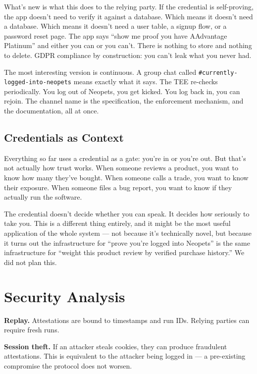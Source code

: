 \documentclass[twocolumn,10pt]{article}
\begin{document}
What's new is what this does to the relying party.
If the credential is self-proving, the app doesn't need to verify it against a database.
Which means it doesn't need a database.
Which means it doesn't need a user table, a signup flow, or a password reset page.
The app says ``show me proof you have AAdvantage Platinum'' and either you can or you can't.
There is nothing to store and nothing to delete.
GDPR compliance by construction: you can't leak what you never had.

The most interesting version is continuous.
A group chat called \texttt{\#currently-logged-into-neopets} means exactly what it says.
The TEE re-checks periodically.
You log out of Neopets, you get kicked.
You log back in, you can rejoin.
The channel name is the specification, the enforcement mechanism, and the documentation, all at once.

\subsection{Credentials as Context}

Everything so far uses a credential as a gate: you're in or you're out.
But that's not actually how trust works.
When someone reviews a product, you want to know how many they've bought.
When someone calls a trade, you want to know their exposure.
When someone files a bug report, you want to know if they actually run the software.

The credential doesn't decide whether you can speak.
It decides how seriously to take you.
This is a different thing entirely, and it might be the most useful application of the whole system --- not because it's technically novel, but because it turns out the infrastructure for ``prove you're logged into Neopets'' is the same infrastructure for ``weight this product review by verified purchase history.''
We did not plan this.

\section{Security Analysis}
\label{sec:security}

\textbf{Replay.} Attestations are bound to timestamps and run IDs. Relying parties can require fresh runs.

\textbf{Session theft.} If an attacker steals cookies, they can produce fraudulent attestations. This is equivalent to the attacker being logged in --- a pre-existing compromise the protocol does not worsen.
\end{document}
